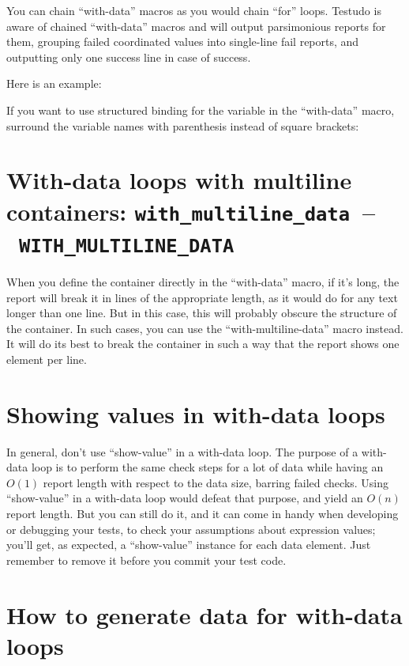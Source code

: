 \documentclass[twoside, a4paper, article]{memoir}
\newcommand*\testudocolor{\color{red!80!blue}}
\newcommand*\testudo[1]{\texttt{\testudocolor{}#1}}
\newcommand*\testudopair[2]{\testudo{#1}~--~\testudo{#2}}
\newcommand\sectiontestudopair[3]{%
  \section[#1]{#1: \testudopair{#2}{#3}}}
\providecommand\typesetexample[1]{%
}
\begin{document}
You can chain ``with-data'' macros as you would chain ``for'' loops.  Testudo
is aware of chained ``with-data'' macros and will output parsimonious reports
for them, grouping failed coordinated values into single-line fail reports, and
outputting only one success line in case of success.

Here is an example:

\typesetexample{with-data}

If you want to use structured binding for the variable in the ``with-data''
macro, surround the variable names with parenthesis instead of square brackets:

\typesetexample{with-data-structured-binding}

\sectiontestudopair{With-data loops with multiline containers}%
  {with\_multiline\_data}{WITH\_MULTILINE\_DATA}

When you define the container directly in the ``with-data'' macro, if it's
long, the report will break it in lines of the appropriate length, as it would
do for any text longer than one line.  But in this case, this will probably
obscure the structure of the container.  In such cases, you can use the
``with-multiline-data'' macro instead.  It will do its best to break the
container in such a way that the report shows one element per line.

\typesetexample{with-multiline-data}

\section{Showing values in with-data loops}
\label{sec:showing-values-with-data-loops}

In general, don't use ``show-value'' in a with-data loop.  The purpose of a
with-data loop is to perform the same check steps for a lot of data while
having an $O(1)$ report length with respect to the data size, barring failed
checks.  Using ``show-value'' in a with-data loop would defeat that purpose,
and yield an $O(n)$ report length.  But you can still do it, and it can come in
handy when developing or debugging your tests, to check your assumptions about
expression values; you'll get, as expected, a ``show-value'' instance for each
data element.  Just remember to remove it before you commit your test code.


\section{How to generate data for with-data loops}
\label{sec:generate-data-with-data-loops}
\end{document}
